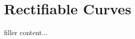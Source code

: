 \documentclass[../../templates/section]{subfiles}
\begin{document}
\section{Rectifiable Curves}\label{sec:rectifiable-curves}

filler content...
\end{document}
